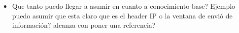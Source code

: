 \begin{itemize}
    \item Que tanto puedo llegar a asumir en cuanto a conocimiento base? Ejemplo puedo asumir que esta claro que es el header IP o la ventana de envió de información? alcanza con poner una referencia?
\end{itemize}